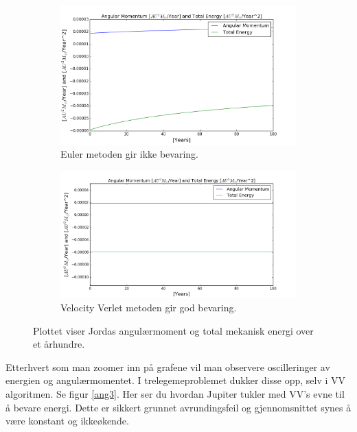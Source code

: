 \documentclass[11pt,a4paper]{article}
\begin{document}
\FloatBarrier
\begin{figure}[!ht]
\centering
\begin{subfigure}{.50\textwidth}
  \centering
  \includegraphics[width=1.1\linewidth]{conserved_euler_J.png}
  \caption{Euler metoden gir ikke bevaring.}
  \label{ang1}
\end{subfigure}%
\begin{subfigure}{.55\textwidth}
  \centering
  \includegraphics[width=1.1\linewidth]{conserved.png}
  \caption{Velocity Verlet metoden gir god bevaring. }
  \label{ang2}
\end{subfigure}
\caption{Plottet viser Jordas angulærmoment og total mekanisk energi over et århundre.}
\label{fig:duhhhhhh}
\end{figure}
\FloatBarrier
Etterhvert som man zoomer inn på grafene vil man observere oscilleringer av energien og angulærmomentet. I trelegemeproblemet dukker disse opp, selv i VV algoritmen.
Se figur \ref{ang3}. Her ser du hvordan Jupiter tukler med VV's evne til å bevare energi. Dette er sikkert grunnet avrundingsfeil og gjennomsnittet synes å være konstant og ikkeøkende.\\
\end{document}
